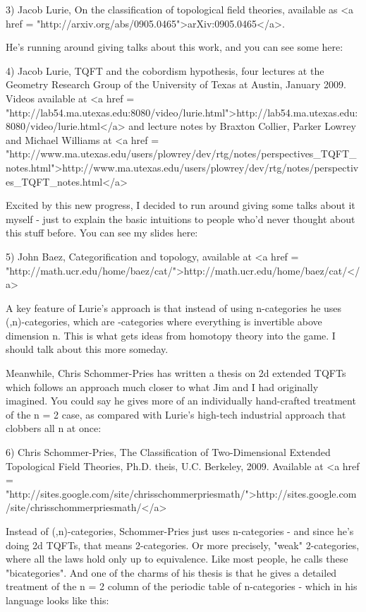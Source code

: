 3) Jacob Lurie, On the classification of topological field theories,
available as <a href = "http://arxiv.org/abs/0905.0465">arXiv:0905.0465</a>.

He's running around giving talks about this work, and you can see some
here:

4) Jacob Lurie, TQFT and the cobordism hypothesis, four lectures at
the Geometry Research Group of the University of Texas at Austin,
January 2009.  Videos available at 
<a href = "http://lab54.ma.utexas.edu:8080/video/lurie.html">http://lab54.ma.utexas.edu:8080/video/lurie.html</a>
and lecture notes by Braxton Collier, Parker Lowrey and Michael 
Williams at
<a href = "http://www.ma.utexas.edu/users/plowrey/dev/rtg/notes/perspectives_TQFT_notes.html">http://www.ma.utexas.edu/users/plowrey/dev/rtg/notes/perspectives_TQFT_notes.html</a>

Excited by this new progress, I decided to run around giving some 
talks about it myself - just to explain the basic intuitions to 
people who'd never thought about this stuff before.  You can see
my slides here:

5) John Baez, Categorification and topology, available at
<a href = "http://math.ucr.edu/home/baez/cat/">http://math.ucr.edu/home/baez/cat/</a>

A key feature of Lurie's approach is that instead of using
n-categories he uses (\infty ,n)-categories, which are
\infty -categories where everything is invertible above dimension n.
This is what gets ideas from homotopy theory into the game.
I should talk about this more someday.

Meanwhile, Chris Schommer-Pries has written a thesis on 2d extended
TQFTs which follows an approach much closer to what Jim and I had originally
imagined.  You could say he gives more of an individually hand-crafted
treatment of the n = 2 case, as compared with Lurie's high-tech industrial 
approach that clobbers all n at once:

6) Chris Schommer-Pries, The Classification of Two-Dimensional 
Extended Topological Field Theories, Ph.D. theis, U.C. Berkeley, 2009.
Available at <a href = "http://sites.google.com/site/chrisschommerpriesmath/">http://sites.google.com/site/chrisschommerpriesmath/</a>

Instead of (\infty ,n)-categories, Schommer-Pries just uses n-categories - 
and since he's doing 2d TQFTs, that means 2-categories.
Or more precisely, "weak" 2-categories, where all the laws hold
only up to equivalence.  Like most people, he calls these 
"bicategories".  And one of the charms of his thesis is that he 
gives a detailed treatment of the n = 2 column of the periodic
table of n-categories - which in his language looks like this:


